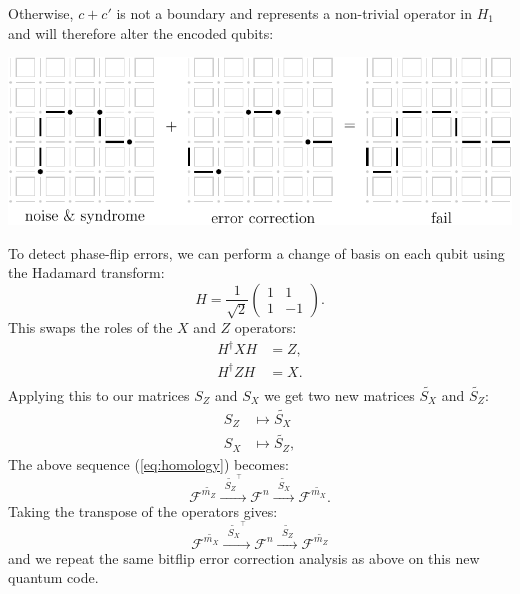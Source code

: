 \documentclass[11pt,oneside]{report}
\newcommand{\danbrowne}[1]{\ \textcolor{red}{\{#1\}}\ }
\newcommand{\Eref}[1]{(\ref{#1})}
\newcommand{\Field}{\mathcal{F}}
\begin{document}
Otherwise, $c+c'$ is not a boundary and represents a non-trivial
operator in $H_1$ and will therefore alter the encoded qubits:
\begin{center}
\includegraphics[width=0.8\columnwidth]{pic-toric-fail.pdf}
\end{center}

To detect phase-flip errors, we can perform a change of basis on each qubit
using the Hadamard transform:
$$
H = \frac{1}{\sqrt{2}} \left( \begin{array}{ll}
1&1\\
1&-1\end{array} \right).
$$
This swaps the roles of the $X$ and $Z$ operators:
\begin{align*}
    H^\dag X H &= Z,\\
    H^\dag Z H &= X.\\
\end{align*}
Applying this to our matrices $S_Z$ and $S_X$ we get 
two new matrices $\widetilde{S_X}$ and $\widetilde{S_Z}$:
\begin{align*}
    S_Z &\mapsto \widetilde{S_X} \\
    S_X &\mapsto \widetilde{S_Z},
\end{align*}
The above sequence \Eref{eq:homology} becomes:
$$
    \Field^{\widetilde{m_Z}} \xrightarrow{\ \ \widetilde{S_Z}^\top\ \ } 
    \Field^{n} \xrightarrow{\ \ \widetilde{S_X}\ \ } 
    \Field^{\widetilde{m_X}}.
$$
Taking the transpose of the operators gives: 
$$
    \Field^{\widetilde{m_X}} \xrightarrow{\ \ \widetilde{S_X}^\top\ \ } 
    \Field^{n} \xrightarrow{\ \ \widetilde{S_Z}\ \ } 
    \Field^{\widetilde{m_Z}}
$$
and we repeat the same bitflip error correction analysis as 
above on this new quantum code.
\end{document}
